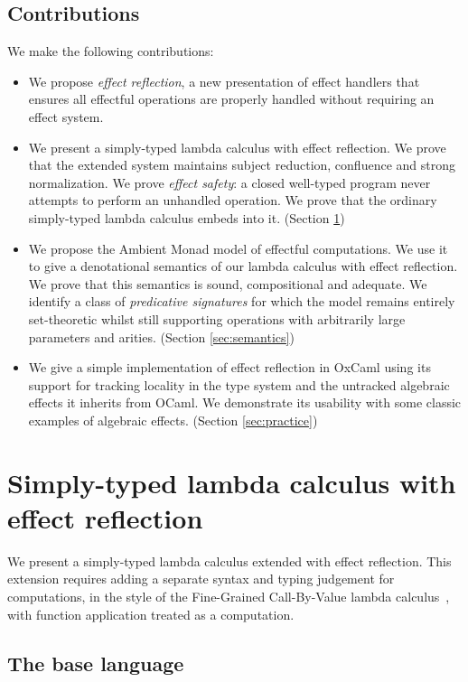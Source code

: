 \documentclass[acmsmall, screen, review, anonymous]{acmart}
\theoremstyle{definition}
\begin{document}
\subsection{Contributions}

We make the following contributions:
\begin{itemize}
\item We propose \emph{effect reflection}, a new presentation of effect
  handlers that ensures all effectful operations are properly handled
  without requiring an effect system.
\item We present a simply-typed lambda calculus with effect
  reflection. We prove that the extended system maintains subject
  reduction, confluence and strong normalization. We prove \emph{effect
    safety}: a closed well-typed program never attempts to perform an
  unhandled operation. We prove that the ordinary simply-typed lambda
  calculus embeds into it. (Section \ref{sec:language})
\item We propose the Ambient Monad model of effectful computations. We
  use it to give a denotational semantics of our lambda calculus with
  effect reflection.  We prove that this semantics is sound,
  compositional and adequate. We identify a class of \emph{predicative
    signatures} for which the model remains entirely set-theoretic
  whilst still supporting operations with arbitrarily large parameters
  and arities.  (Section \ref{sec:semantics})
\item We give a simple implementation of effect reflection in OxCaml
  using its support for tracking locality in the type system and the
  untracked algebraic effects it inherits from OCaml. We demonstrate its
  usability with some classic examples of algebraic effects. (Section
  \ref{sec:practice})
\end{itemize}

\section{Simply-typed lambda calculus with effect reflection}
\label{sec:language}

We present a simply-typed lambda calculus extended with effect
reflection. This extension requires adding a separate syntax and typing
judgement for computations, in the style of the Fine-Grained
Call-By-Value lambda calculus~\cite{levy2003modelling}, with function
application treated as a computation.

\subsection{The base language}
\end{document}
